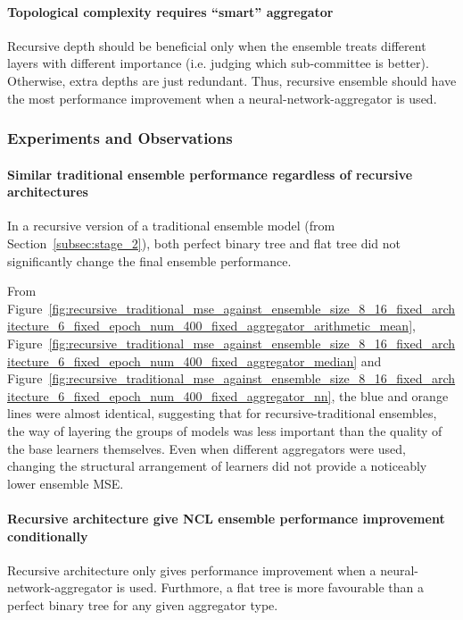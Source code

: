 \paragraph{Topological complexity requires ``smart'' aggregator}
Recursive depth should be beneficial only when the ensemble treats different layers with different importance (i.e. judging which sub-committee is better). Otherwise, extra depths are just redundant. Thus, recursive ensemble should have the most performance improvement when a neural-network-aggregator is used. 


\subsubsection{Experiments and Observations}
\label{subsubsec:evaluation_recursive_observations}
\paragraph{Similar traditional ensemble performance regardless of recursive architectures}
In a recursive version of a traditional ensemble model (from Section~\ref{subsec:stage_2}), both perfect binary tree and flat tree did not significantly change the final ensemble performance. 

From Figure~\ref{fig:recursive_traditional_mse_against_ensemble_size_8_16_fixed_architecture_6_fixed_epoch_num_400_fixed_aggregator_arithmetic_mean}, Figure~\ref{fig:recursive_traditional_mse_against_ensemble_size_8_16_fixed_architecture_6_fixed_epoch_num_400_fixed_aggregator_median} and Figure~\ref{fig:recursive_traditional_mse_against_ensemble_size_8_16_fixed_architecture_6_fixed_epoch_num_400_fixed_aggregator_nn}, the blue and orange lines were almost identical, suggesting that for recursive-traditional ensembles, the way of layering the groups of models was less important than the quality of the base learners themselves. Even when different aggregators were used, changing the structural arrangement of learners did not provide a noticeably lower ensemble MSE. 

\paragraph{Recursive architecture give NCL ensemble performance improvement conditionally}
Recursive architecture only gives performance improvement when a neural-network-aggregator is used. Furthmore, a flat tree is more favourable than a perfect binary tree for any given aggregator type. 

